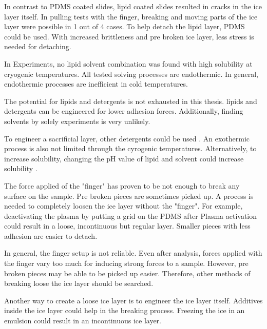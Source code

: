In contrast to PDMS coated slides, lipid coated slides resulted in cracks in the ice layer itself. In pulling tests with the finger, breaking and moving parts of the ice layer were possible in 1 out of 4 cases. To help detach the lipid layer, PDMS could be used. With increased brittleness and pre broken ice layer, less stress is needed for detaching.

In Experiments, no lipid solvent combination was found with high solubility at cryogenic temperatures. All tested solving processes are endothermic. In general, endothermic processes are inefficient in cold temperatures.

 The potential for lipids and detergents is not exhausted in this thesis. lipids and detergents can be engineered for lower adhesion forces. Additionally, finding solvents by solely experiments is very unlikely. 

To engineer a sacrificial layer, other detergents could be used \cite{SigmaAldrich.2023}. An exothermic process is also not limited through the cyrogenic temperatures. Alternatively, to increase solubility, changing the pH value of lipid and solvent could increase solubility \cite{BruceA.AverillPatriciaEldredge.}.

The force applied of the "finger" has proven to be not enough to break any surface on the sample. Pre broken pieces are sometimes picked up. A process is needed to completely loosen the ice layer without the "finger". For example, deactivating the plasma by putting a grid on the PDMS after Plasma activation could result in a loose, incontinuous but regular layer. Smaller pieces with less adhesion are easier to detach.

In general, the finger setup is not reliable. Even after analysis, forces applied with the finger vary too much for inducing strong forces to a sample. However, pre broken pieces may be able to be picked up easier. Therefore, other methods of breaking loose the ice layer should be searched.

Another way to create a loose ice layer is to engineer the ice layer itself. Additives inside the ice layer could help in the breaking process. Freezing the ice in an emulsion could result in an incontinuous ice layer. 

